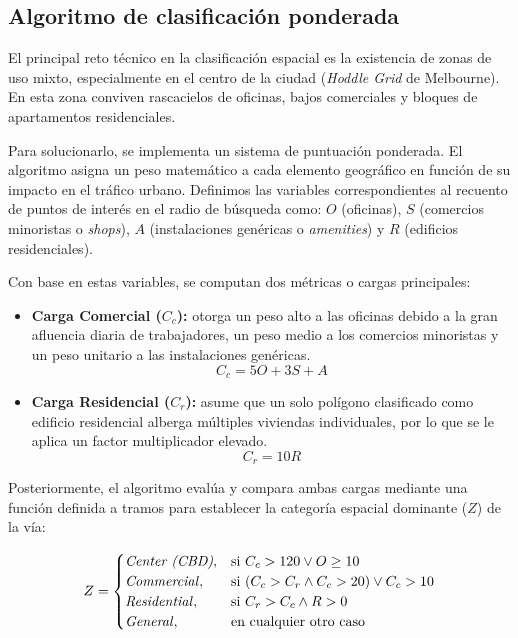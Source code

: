 \subsection{Algoritmo de clasificación ponderada}
\label{subsec:clasificacion_ponderada}

El principal reto técnico en la clasificación espacial es la existencia de zonas de uso mixto, especialmente en el centro de la ciudad (\textit{Hoddle Grid} de Melbourne). En esta zona conviven rascacielos de oficinas, bajos comerciales y bloques de apartamentos residenciales. 

Para solucionarlo, se implementa un sistema de puntuación ponderada. El algoritmo asigna un peso matemático a cada elemento geográfico en función de su impacto en el tráfico urbano. Definimos las variables correspondientes al recuento de puntos de interés en el radio de búsqueda como: \(O\) (oficinas), \(S\) (comercios minoristas o \textit{shops}), \(A\) (instalaciones genéricas o \textit{amenities}) y \(R\) (edificios residenciales).

Con base en estas variables, se computan dos métricas o cargas principales:

\begin{itemize}
	\item \textbf{Carga Comercial (\(C_c\)):} otorga un peso alto a las oficinas debido a la gran afluencia diaria de trabajadores, un peso medio a los comercios minoristas y un peso unitario a las instalaciones genéricas.
	\begin{equation}
		\label{eq:carga_comercial}
		C_c = 5O + 3S + A
	\end{equation}
	
	\item \textbf{Carga Residencial (\(C_r\)):} asume que un solo polígono clasificado como edificio residencial alberga múltiples viviendas individuales, por lo que se le aplica un factor multiplicador elevado.
	\begin{equation}
		\label{eq:carga_residencial}
		C_r = 10R
	\end{equation}
\end{itemize}

Posteriormente, el algoritmo evalúa y compara ambas cargas mediante una función definida a tramos para establecer la categoría espacial dominante (\(Z\)) de la vía:

\begin{equation}
	\label{eq:clasificacion_zona}
	Z = 
	\begin{cases} 
		\text{\textit{Center (CBD)}}, & \text{si } C_c > 120 \lor O \geq 10 \\ 
		\text{\textit{Commercial}}, & \text{si } (C_c > C_r \land C_c > 20) \lor C_c > 10 \\ 
		\text{\textit{Residential}}, & \text{si } C_r > C_c \land R > 0 \\ 
		\text{\textit{General}}, & \text{en cualquier otro caso} 
	\end{cases}
\end{equation}

